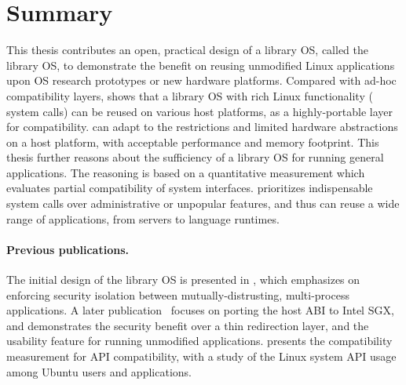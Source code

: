 


\section{Summary}

This thesis contributes an open, practical design of a library OS, called the \graphene{} library OS,
to demonstrate the benefit on reusing unmodified Linux applications upon OS research prototypes or new hardware platforms.
Compared with ad-hoc compatibility layers, \graphene{} shows that
a library OS with rich Linux functionality (\graphenesyscalls{} system calls) can be reused on various host platforms, as a highly-portable layer for compatibility.
\graphene{} can adapt to the restrictions and
limited hardware abstractions on a host platform, with acceptable performance and memory footprint.
This thesis further reasons about the sufficiency of a library OS
for running general applications. The reasoning is based on a quantitative measurement which evaluates partial compatibility of system interfaces.
\graphene{} prioritizes indispensable system calls over administrative or unpopular features,
and thus can reuse a wide range of applications, from servers to language runtimes.


\paragraph{Previous publications.}
The initial design of the \graphene{} library OS is presented in \cite{tsai14graphene}, which emphasizes on enforcing security isolation between mutually-distrusting, multi-process applications.
A later publication~\cite{tsai17graphene-sgx} focuses on porting the host ABI
to Intel SGX, and demonstrates the security benefit 
over a thin redirection layer, and the usability feature for running unmodified applications.
\cite{tsai16apistudy} presents the compatibility measurement for API compatibility,
with a study of the Linux system API usage among Ubuntu users and applications.

